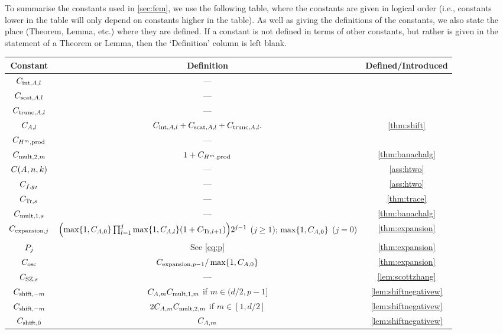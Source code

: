 To summarise the constants used in \cref{sec:fem}, we use the following table, where the constants are given in logical order (i.e., constants lower in the table will only depend on constants higher in the table). As well as giving the definitions of the constants, we also state the place (Theorem, Lemma, etc.) where they are defined. If a constant is not defined in terms of other constants, but rather is given in the statement of a Theorem or Lemma, then the `Definition' column is left blank.

\begin{longtabu}{ccc}
  \toprule
  Constant & Definition & Defined/Introduced\\
  \midrule
  \endhead
  $C_{\mathrm{int},A,l}$ & ---& \cite[Theorem 4.16]{Mc:00}\\
  $C_{\mathrm{scat},A,l}$ & ---& \cite[Theorem 4.18(i)]{Mc:00}\\
    $C_{\mathrm{trunc},A,l}$ & ---& \cite[Theorem 4.18(ii)]{Mc:00}\\
  $C_{A,l}$ & $C_{\mathrm{int},A,l} + C_{\mathrm{scat},A,l} + C_{\mathrm{trunc},A,l}.$ & \cref{thm:shift}\\
  $C_{H^{m},\mathrm{prod}}$&---&\cite[Theorem 3.20]{Mc:00}\\ 
  $C_{\mathrm{mult},2,m}$ &$1+C_{H^{m},\mathrm{prod}}$&\cref{thm:banachalg} \\
  $\CAnk$ &---& \cref{ass:htwo}\\
  $C_{f,g_{I}}$ &---& \cref{ass:htwo}\\
  $C_{\mathrm{Tr},s}$ &---& \cref{thm:trace}\\
  $C_{\mathrm{mult},1,s}$ & --- & \cref{thm:banachalg}\\
  $C_{\mathrm{expansion},j}$ & $\mleft(\max\set{1,\CAz} \prod_{l=1}^j \max\set{1,\CAfn{l}} \mleft(1+\CTrfn{l+1}\mright)\mright)2^{j-1}$ ($j \geq 1$); $\max\set{1,\CAz}$ ($j=0$)& \cref{thm:expansion}\\
  $P_{j}$ & See \cref{eq:p}& \cref{thm:expansion}\\
  $C_{\mathrm{osc}}$ & $\Cefn{p-1}/\max\set{1,\CAz}$ & \cref{thm:expansion}\\
  $C_{\mathrm{SZ},s}$ &---& \cref{lem:scottzhang}\\
  $C_{\mathrm{shift},-m}$ &$C_{A,m}C_{\mathrm{mult},1,m}$ if $ m \in (d/2,p-1]$& \cref{lem:shiftnegativew}\\
    $C_{\mathrm{shift},-m}$ &$2C_{A,m}C_{\mathrm{mult},2,m}$ if $m \in [1,d/2]$& \cref{lem:shiftnegativew}\\
      $C_{\mathrm{shift},0}$ &$C_{A,m}$& \cref{lem:shiftnegativew}\\

\end{longtabu}
